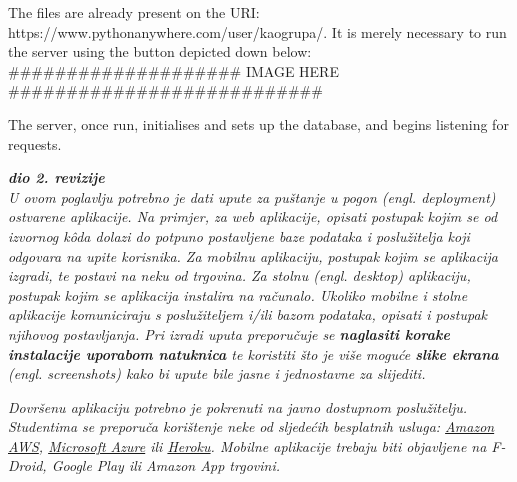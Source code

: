 				The files are already present on the URI: https://www.pythonanywhere.com/user/kaogrupa/. It is merely necessary to run the server using the button depicted down below:
				####################		IMAGE HERE			###########################
				
				The server, once run, initialises and sets up the database, and begins listening for requests. 
			
			\textbf{\textit{dio 2. revizije}}\\
		
			 \textit{U ovom poglavlju potrebno je dati upute za puštanje u pogon (engl. deployment) ostvarene aplikacije. Na primjer, za web aplikacije, opisati postupak kojim se od izvornog kôda dolazi do potpuno postavljene baze podataka i poslužitelja koji odgovara na upite korisnika. Za mobilnu aplikaciju, postupak kojim se aplikacija izgradi, te postavi na neku od trgovina. Za stolnu (engl. desktop) aplikaciju, postupak kojim se aplikacija instalira na računalo. Ukoliko mobilne i stolne aplikacije komuniciraju s poslužiteljem i/ili bazom podataka, opisati i postupak njihovog postavljanja. Pri izradi uputa preporučuje se \textbf{naglasiti korake instalacije uporabom natuknica} te koristiti što je više moguće \textbf{slike ekrana} (engl. screenshots) kako bi upute bile jasne i jednostavne za slijediti.}
			
			
			 \textit{Dovršenu aplikaciju potrebno je pokrenuti na javno dostupnom poslužitelju. Studentima se preporuča korištenje neke od sljedećih besplatnih usluga: \href{https://aws.amazon.com/}{Amazon AWS}, \href{https://azure.microsoft.com/en-us/}{Microsoft Azure} ili \href{https://www.heroku.com/}{Heroku}. Mobilne aplikacije trebaju biti objavljene na F-Droid, Google Play ili Amazon App trgovini.}
			
			
			\eject 